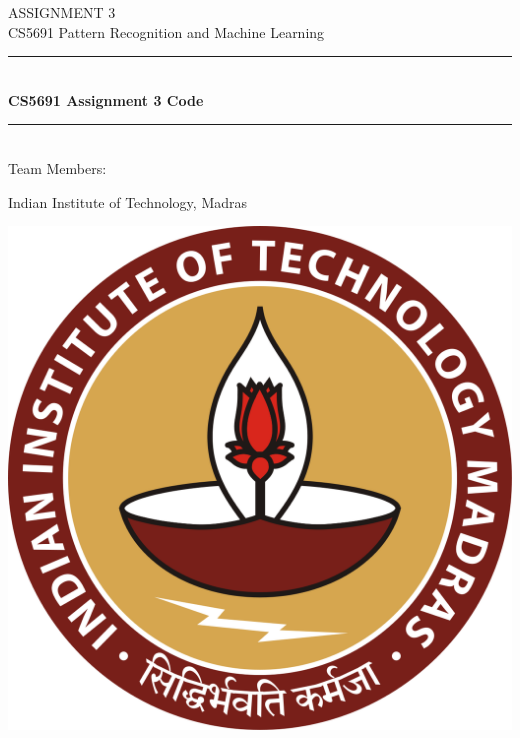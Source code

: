 \documentclass[11pt,a4paper]{article}
\begin{document}
    \begin{titlepage} 
        \begin{center}
        \large{ASSIGNMENT 3}\\
        \vspace{2em}
        \large {CS5691 Pattern Recognition and Machine Learning}
        \vspace{3em}
        
        \rule{0.9\linewidth}{0.5mm} \\[0.4cm]
        {\Large{\bfseries{CS5691 Assignment 3 Code}}} \\
        \rule{0.9\linewidth}{0.5mm} \\[3 em]    
        
        Team Members: \\
        \vspace{0.5em}
        

        \vspace{1em}

        Indian Institute of Technology, Madras\\    
        
        \vspace{5em}    
        
            \includegraphics[scale = 0.09]{images/iitmlogo.png}
        \end{center}
    \end{titlepage}
\end{document}
